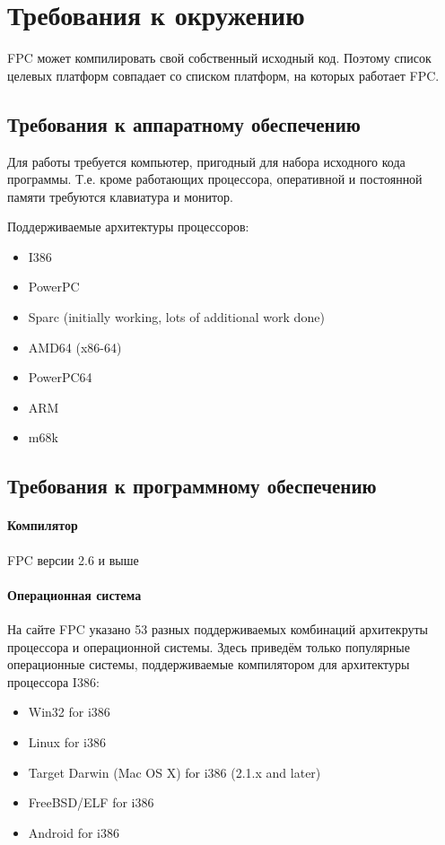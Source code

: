 \documentclass{imcs}
\begin{document}
\section{Требования к окружению}

FPC может компилировать свой собственный исходный код. Поэтому
список целевых платформ совпадает со списком платформ, на которых работает
FPC.

\subsection{Требования к аппаратному обеспечению}

Для работы требуется компьютер, пригодный для набора исходного кода программы.
Т.е. кроме работающих процессора, оперативной и постоянной памяти требуются
клавиатура и монитор.

Поддерживаемые архитектуры процессоров\cite{fpctargets}:
\begin{itemize}
    \item I386
    \item PowerPC
    \item Sparc (initially working, lots of additional work done)
    \item AMD64 (x86-64)
    \item PowerPC64
    \item ARM
    \item m68k 
\end{itemize}

\subsection{Требования к программному обеспечению}

\paragraph{Компилятор} FPC версии 2.6 и выше
\paragraph{Операционная система}
На сайте FPC указано 53 разных поддерживаемых комбинаций архитекруты 
процессора и операционной системы\cite{fpctargets}. Здесь приведём
только популярные операционные системы, поддерживаемые компилятором
для архитектуры процессора I386:
\begin{itemize}
    \item Win32 for i386
    \item Linux for i386
    \item Target Darwin (Mac OS X) for i386 (2.1.x and later)
    \item FreeBSD/ELF for i386
    \item Android for i386
\end{itemize}
    
\end{document}
